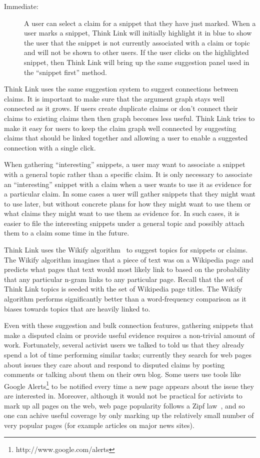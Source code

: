 \documentclass{chi2009}
\begin{document}
\begin{description}
\item[Immediate:] A user can select a claim for a snippet that they have just marked. When a user marks a snippet, Think Link will initially highlight it in blue to show the user that the snippet is not currently associated with a claim or topic and will not be shown to other users. If the user clicks on the highlighted snippet, then Think Link will bring up the same suggestion panel used in the ``snippet first'' method.
\end{description}

Think Link uses the same suggestion system to suggest connections between claims. It is important to make sure that the argument graph stays well connected as it grows. If users create duplicate claims or don't connect their claims to existing claims then then graph becomes less useful. Think Link tries to make it easy for users to keep the claim graph well connected by suggesting claims that should be linked together and allowing a user to enable a suggested connection with a single click. 

When gathering ``interesting'' snippets, a user may want to associate a snippet with a general topic rather than a specific claim. It is only necessary to associate an ``interesting'' snippet with a claim when a user wants to use it as evidence for a particular claim. In some cases a user will gather snippets that they might want to use later, but without concrete plans for how they might want to use them or what claims they might want to use them as evidence for. In such cases, it is easier to file the interesting snippets under a general topic and possibly attach them to a claim some time in the future. 

Think Link uses the Wikify algorithm~\cite{Mihalcea2007} to suggest topics for snippets or claims. The Wikify algorithm imagines that a piece of text was on a Wikipedia page and predicts what pages that text would most likely link to based on the probability that any particular n-gram links to any particular page. Recall that the set of Think Link topics is seeded with the set of Wikipedia page titles. The Wikify algorithm performs significantly better than a word-frequency comparison as it biases towards topics that are heavily linked to.

Even with these suggestion and bulk connection features, gathering snippets that make a disputed claim or provide useful evidence requires a non-trivial amount of work. Fortunately, several activist users we talked to told us that they already spend a lot of time performing similar tasks; currently they search for web pages about issues they care about and respond to disputed claims by posting comments or talking about them on their own blog. Some users use tools like Google Alerts\footnote{http://www.google.com/alerts} to be notified every time a new page appears about the issue they are interested in. Moreover, although it would not be practical for activists to mark up all pages on the web, web page popularity follows a Zipf law~\cite{Krashkov2006}, and so one can achive useful coverage by only marking up the relatively small number of very popular pages (for example articles on major news sites).
\end{document}
